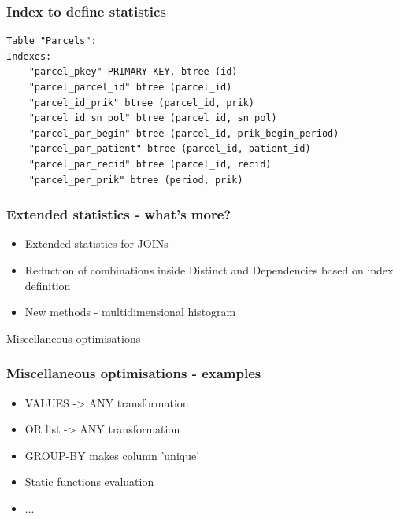 \documentclass{beamer}
\begin{document}
%
%
\begin{frame}[fragile]\frametitle{Index to define statistics}
\begin{lstlisting}[basicstyle=\footnotesize]
Table "Parcels":
Indexes:
    "parcel_pkey" PRIMARY KEY, btree (id)
    "parcel_parcel_id" btree (parcel_id)
    "parcel_id_prik" btree (parcel_id, prik)
    "parcel_id_sn_pol" btree (parcel_id, sn_pol)
    "parcel_par_begin" btree (parcel_id, prik_begin_period)
    "parcel_par_patient" btree (parcel_id, patient_id)
    "parcel_par_recid" btree (parcel_id, recid)
    "parcel_per_prik" btree (period, prik)
\end{lstlisting}
\end{frame}

\begin{frame}[fragile]\frametitle{Extended statistics - what's more?}
\begin{itemize}
  \item Extended statistics for JOINs
  \item Reduction of combinations inside Distinct and Dependencies based on index definition
  \item New methods - multidimensional histogram
\end{itemize}
\end{frame}

\begin{frame}
\vspace*{\fill}
\begin{center}
Miscellaneous optimisations
\end{center}
\vspace*{\fill}
\end{frame}

\begin{frame}[fragile]\frametitle{Miscellaneous optimisations - examples}
\begin{itemize}
  \item VALUES -> ANY transformation
  \item OR list -> ANY transformation
  \item GROUP-BY makes column 'unique'
  \item Static functions evaluation
  \item ...
\end{itemize}
\end{frame}
\end{document}
